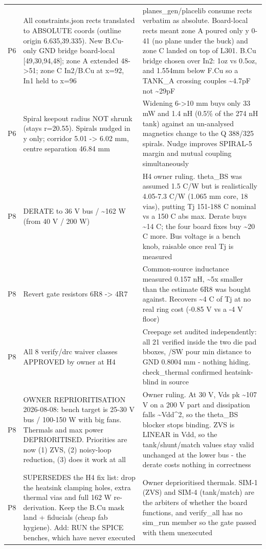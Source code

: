 \documentclass[11pt,a4paper]{article}
\begin{document}
{\begin{longtable}{lp{5.2cm}p{7.2cm}}
P6 & All constraints.json rects translated to ABSOLUTE coords (outline origin 6.635,39.335). New B.Cu-only GND bridge board-local {[}49,30,94,48{]}; zone A extended 48-\textgreater{}51; zone C In2/B.Cu at x=92, In1 held to x=96 & planes\_gen/placelib consume rects verbatim as absolute. Board-local rects meant zone A poured only y 0-41 (no plane under the buck) and zone C landed on top of L301. B.Cu bridge chosen over In2: 1oz vs 0.5oz, and 1.554mm below F.Cu so a TANK\_A crossing couples \textasciitilde{}4.7pF not \textasciitilde{}29pF \\
P6 & Spiral keepout radius NOT shrunk (stays r=20.55). Spirals nudged in y only; corridor 5.01 -\textgreater{} 6.02 mm, centre separation 46.84 mm & Widening 6-\textgreater{}10 mm buys only 33 mW and 1.4 nH (0.5\% of the 274 nH tank) against an un-analysed magnetics change to the Q 388/325 spirals. Nudge improves SPIRAL-5 margin and mutual coupling simultaneously \\
P8 & DERATE to 36 V bus / \textasciitilde{}162 W (from 40 V / 200 W) & H4 owner ruling. theta\_BS was assumed 1.5 C/W but is realistically 4.05-7.3 C/W (1.065 mm core, 18 vias), putting Tj 151-188 C nominal vs a 150 C abs max. Derate buys \textasciitilde{}14 C; the four board fixes buy \textasciitilde{}20 C more. Bus voltage is a bench knob, raisable once real Tj is measured \\
P8 & Revert gate resistors 6R8 -\textgreater{} 4R7 & Common-source inductance measured 0.157 nH, \textasciitilde{}5x smaller than the estimate 6R8 was bought against. Recovers \textasciitilde{}4 C of Tj at no real ring cost (-0.85 V vs a -4 V floor) \\
P8 & All 8 verify/drc waiver classes APPROVED by owner at H4 & Creepage set audited independently: all 21 verified inside the two die pad bboxes, /SW pour min distance to GND 0.8004 mm - nothing hiding. check\_thermal confirmed heatsink-blind in source \\
P8 & OWNER REPRIORITISATION 2026-08-08: bench target is 25-30 V bus / 100-150 W with big fans. Thermals and max power DEPRIORITISED. Priorities are now (1) ZVS, (2) noisy-loop reduction, (3) does it work at all & Owner ruling. At 30 V, Vds pk \textasciitilde{}107 V on a 200 V part and dissipation falls \textasciitilde{}Vdd\textasciicircum{}2, so the theta\_BS blocker stops binding. ZVS is LINEAR in Vdd, so the tank/shunt/match values stay valid unchanged at the lower bus - the derate costs nothing in correctness \\
P8 & SUPERSEDES the H4 fix list: drop the heatsink clamping holes, extra thermal vias and full 162 W re-derivation. Keep the B.Cu mask land + fiducials (cheap fab hygiene). Add: RUN the SPICE benches, which have never executed & Owner deprioritised thermals. SIM-1 (ZVS) and SIM-4 (tank/match) are the arbiters of whether the board functions, and verify\_all has no sim\_run member so the gate passed with them unexecuted \\

\end{longtable}}
\end{document}
